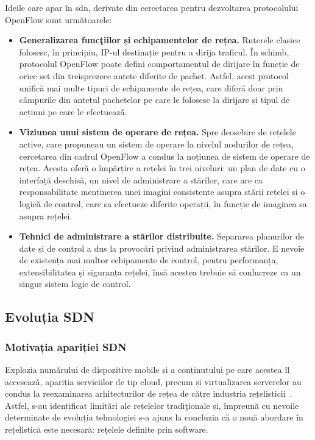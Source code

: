 Ideile care apar în \gls{sdn}, derivate din cercetarea pentru dezvoltarea protocolului OpenFlow sunt următoarele:
\begin{itemize}
	\item \textbf{Generalizarea funcţiilor și echipamentelor de rețea.} Ruterele clasice folosesc, în principiu, IP-ul destinație pentru a dirija traficul. În schimb, protocolul OpenFlow poate defini comportamentul de dirijare în funcție de orice set din treisprezece antete diferite de pachet. Astfel, acest protocol unifică mai multe tipuri de echipamente de rețea, care diferă doar prin câmpurile din antetul pachetelor pe care le folosesc la dirijare și tipul de acțiuni pe care le efectuează.
	\item \textbf{Viziunea unui sistem de operare de rețea.} Spre deosebire de rețelele active, care propuneau un sistem de operare la nivelul nodurilor de rețea, cercetarea din cadrul OpenFlow a condus la noțiunea de sistem de operare de rețea. Acesta oferă o împărțire a rețelei în trei niveluri: un plan de date cu o interfață deschisă, un nivel de administrare a stărilor, care are ca responsabilitate menținerea unei imagini consistente asupra stării rețelei și o logică de control, care sa efectueze diferite operații, în funcție de imaginea sa asupra rețelei.
	\item \textbf{Tehnici de administrare a stărilor distribuite.} Separarea planurilor de date și de control a dus la provocări privind administrarea stărilor. E nevoie de existența mai multor echipamente de control, pentru performanța, extensibilitatea și siguranța rețelei, însă acestea trebuie să conlucreze ca un singur sistem logic de control.
\end{itemize}


\subsection{Evoluția SDN}

\subsubsection{Motivația apariției SDN}

Explozia numărului de dispozitive mobile și a conținutului pe care acestea îl accesează, apariția serviciilor de tip cloud, precum și virtualizarea serverelor au condus la reexaminarea arhitecturilor de rețea de către industria rețelisticii~\cite{ome2012software}. Astfel, s-au identificat limitări ale rețelelor tradiţionale și, împreună cu nevoile determinate de evoluția tehnologiei s-a ajuns la concluzia că o nouă abordare în rețelistică este necesară: rețelele definite prin software.

